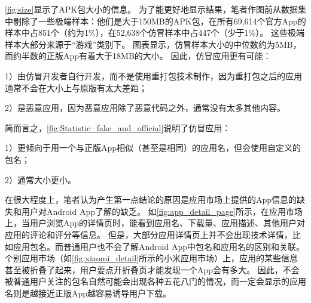 \autoref{fig:size}显示了APK包大小的信息。
为了能更好地显示结果，笔者作图前从数据集中剔除了一些极端样本：他们是大于150MB的APK包，在所有69,614个官方App的样本中占851个（约为1\%），在52,638个仿冒样本中占447个（少于1\%）。
这些极端样本大部分来源于``游戏''类别下。
图表显示，仿冒样本大小的中位数约为5MB，而约半数的正版App有着大于18MB的大小。
因此，仿冒应用更有可能：

1）由仿冒开发者自行开发，而不是使用重打包技术制作，因为重打包之后的应用通常不会在大小上与原版有太大差距；

2）是恶意应用，因为恶意应用除了恶意代码之外，通常没有太多其他内容。
\vspace{1mm}

简而言之，\autoref{fig:Statistic_fake_and_official}说明了仿冒应用：

1）更倾向于用一个与正版App相似（甚至是相同）的应用名，但会使用自定义的包名；

2）通常大小更小。
\vspace{1mm}

在很大程度上，笔者认为产生第一点结论的原因是应用市场上提供的App信息的缺失和用户对Android App了解的缺乏。
如\autoref{fig:app_detail_page}所示，在应用市场上，当用户浏览App的详情页时，能看到应用名、下载量、应用描述、其他用户对应用的评论和评分等信息。
但是，大部分应用详情页上并不会出现技术详情，比如应用包名。而普通用户也不会了解Android App中包名和应用名的区别和关联。
个别应用市场（如\autoref{fig:xiaomi_detail}所示的小米应用市场）上，应用的某些信息甚至被折叠了起来，用户要点开折叠页才能发现一个App会有多大。
因此，不会被普通用户关注的包名自然可能会出现各种五花八门的情况，而一定会显示的应用名则是越接近正版App越容易诱导用户下载。


